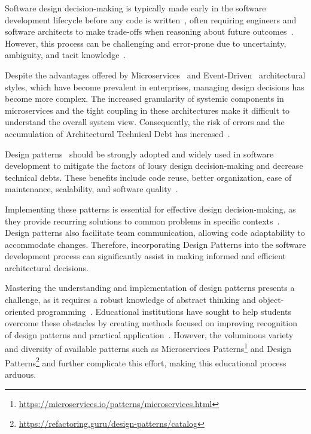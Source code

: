 Software design decision-making is typically made early in the software development lifecycle before any code is written~\cite{Farshidi2020}, often requiring engineers and software architects to make trade-offs when reasoning about future outcomes~\cite{Becker2017}. However, this process can be challenging and error-prone due to uncertainty, ambiguity, and tacit knowledge~\cite{Liang2023}.

Despite the advantages offered by Microservices~\cite{Boner2017, Newman2019} and Event-Driven~\cite{Bellemare2020} architectural styles, which have become prevalent in enterprises, managing design decisions has become more complex. The increased granularity of systemic components in microservices and the tight coupling in these architectures make it difficult to understand the overall system view. Consequently, the risk of errors and the accumulation of Architectural Technical Debt has increased~\cite{Ernst2015}.

Design patterns~\cite{Gamma1994, Martin2002, Joshua2004} should be strongly adopted and widely used in software development to mitigate the factors of lousy design decision-making and decrease technical debts. These benefits include code reuse, better organization, ease of maintenance, scalability, and software quality~\cite{Holub2004, Barros2018}. 

Implementing these patterns is essential for effective design decision-making, as they provide recurring solutions to common problems in specific contexts~\cite{buschmann1996pattern}. Design patterns also facilitate team communication, allowing code adaptability to accommodate changes. Therefore, incorporating Design Patterns into the software development process can significantly assist in making informed and efficient architectural decisions.

Mastering the understanding and implementation of design patterns presents a challenge, as it requires a robust knowledge of abstract thinking and object-oriented programming~\cite{chang2011pattern}. Educational institutions have sought to help students overcome these obstacles by creating methods focused on improving recognition of design patterns and practical application~\cite{fojtik2014, lotz2014}. However, the voluminous variety and diversity of available patterns such as Microservices Patterns\footnote{\url{https://microservices.io/patterns/microservices.html}} and Design Patterns\footnote{\url{https://refactoring.guru/design-patterns/catalog}} and further complicate this effort, making this educational process arduous. 

